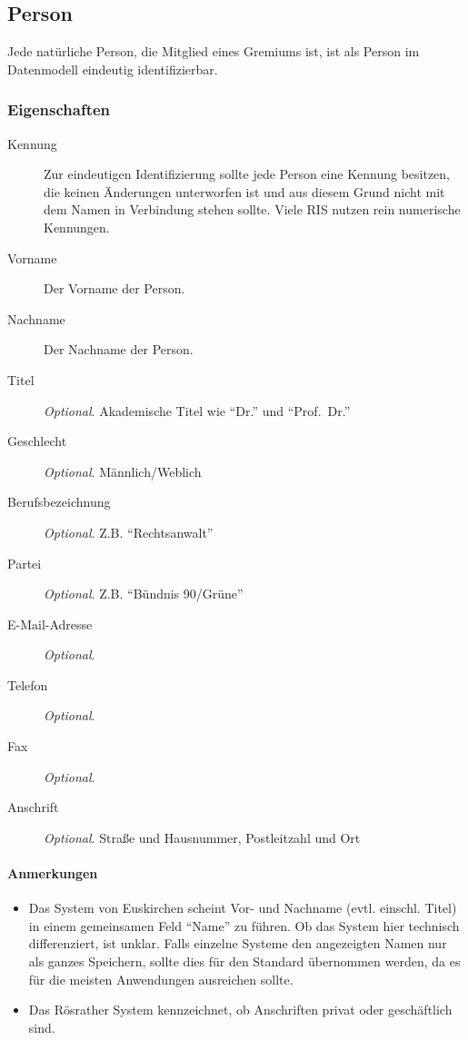 \subsection{Person}

Jede natürliche Person, die Mitglied eines Gremiums ist, ist als Person
im Datenmodell eindeutig identifizierbar.

\subsubsection{Eigenschaften}

\begin{description}
\item[Kennung]
Zur eindeutigen Identifizierung sollte jede Person eine Kennung
besitzen, die keinen Änderungen unterworfen ist und aus diesem Grund
nicht mit dem Namen in Verbindung stehen sollte. Viele RIS nutzen rein
numerische Kennungen.
\item[Vorname]
Der Vorname der Person.
\item[Nachname]
Der Nachname der Person.
\item[Titel]
\emph{Optional}. Akademische Titel wie ``Dr.'' und ``Prof.~Dr.''
\item[Geschlecht]
\emph{Optional}. Männlich/Weblich
\item[Berufsbezeichnung]
\emph{Optional}. Z.B. ``Rechtsanwalt''
\item[Partei]
\emph{Optional}. Z.B. ``Bündnis 90/Grüne''
\item[E-Mail-Adresse]
\emph{Optional}.
\item[Telefon]
\emph{Optional}.
\item[Fax]
\emph{Optional}.
\item[Anschrift]
\emph{Optional}. Straße und Hausnummer, Postleitzahl und Ort
\end{description}

\paragraph{Anmerkungen}

\begin{itemize}
\item
  Das System von Euskirchen scheint Vor- und Nachname (evtl. einschl.
  Titel) in einem gemeinsamen Feld ``Name'' zu führen. Ob das System
  hier technisch differenziert, ist unklar. Falls einzelne Systeme den
  angezeigten Namen nur als ganzes Speichern, sollte dies für den
  Standard übernommen werden, da es für die meisten Anwendungen
  ausreichen sollte.
\item
  Das Rösrather System kennzeichnet, ob Anschriften privat oder
  geschäftlich sind.
\end{itemize}

